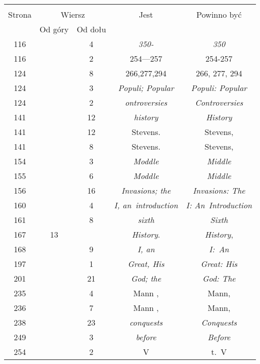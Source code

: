 \documentclass[a4paper,11pt]{article}
\begin{document}
\begin{center}
  \begin{tabular}{|c|c|c|c|c|}
    \hline
    & \multicolumn{2}{c|}{} & & \\
    Strona & \multicolumn{2}{c|}{Wiersz} & Jest
                              & Powinno być \\ \cline{2-3}
    & Od góry & Od dołu & & \\
    \hline
    116 & &  4 & \emph{350-} & \emph{350} \\
    116 & &  2 & 254---257 & 254-257 \\
    124 & &  8 & 266,277,294 & 266, 277, 294 \\
    124 & &  3 & \emph{Populi; Popular} & \emph{Populi: Popular} \\
    124 & &  2 & \emph{ontroversies} & \emph{Controversies} \\
    141 & & 12 & \emph{history} & \emph{History} \\
    141 & & 12 & Stevens. & Stevens, \\
    141 & &  8 & Stevens. & Stevens, \\
    154 & &  3 & \emph{Moddle} & \emph{Middle} \\
    155 & &  6 & \emph{Moddle} & \emph{Middle} \\
    156 & & 16 & \emph{Invasions; the} & \emph{Invasions: The} \\
    160 & &  4 & \emph{I, an~introduction} & \emph{I: An~Introduction} \\
    161 & &  8 & \emph{sixth} & \emph{Sixth} \\
    167 & 13 & & \emph{History}. & \emph{History}, \\
    168 & &  9 & \emph{I, an} & \emph{I:~An} \\
    197 & &  1 & \emph{Great, His} & \emph{Great: His} \\
    201 & & 21 & \emph{God; the} & \emph{God: The} \\
    235 & &  4 & Mann , & Mann, \\
    236 & &  7 & Mann , & Mann, \\
    238 & & 23 & \emph{conquests} & \emph{Conquests} \\
    249 & &  3 & \emph{before} & \emph{Before} \\
    254 & &  2 & V & t.~V \\

\end{tabular}
\end{center}
\end{document}
